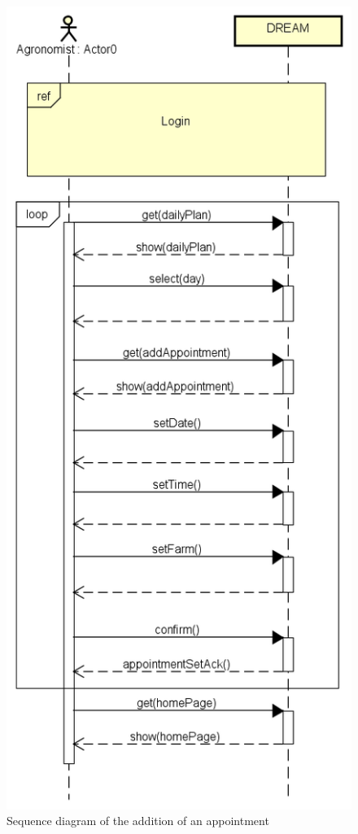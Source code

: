 \bigskip
\begin{figure}[H]
    \centering
    \includegraphics[scale=0.6]{Images/agronomistAddsAppointment.png}
    \caption{Sequence diagram of the addition of an appointment}
\end{figure}

